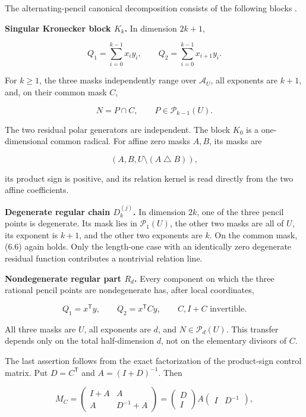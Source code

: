 \documentclass[11pt]{article}
\theoremstyle{remark}
\numberwithin{equation}{section}
\begin{document}
The alternating-pencil canonical decomposition consists of the following
blocks \cite{plut2015,macariorat2013}.

\textbf{Singular Kronecker block \(K_k\).} In dimension \(2k+1\),

\[
Q_1=\sum_{i=0}^{k-1}x_iy_i,
\qquad
Q_2=\sum_{i=0}^{k-1}x_{i+1}y_i.                \tag{6.5}
\]

For \(k\ge1\), the three masks independently range over \(\mathcal A_U\), all
exponents are \(k+1\), and, on their common mask \(C\),

\[
N=P\cap C,\qquad P\in\mathcal P_{k-1}(U).      \tag{6.6}
\]

The two residual polar generators are independent. The block \(K_0\) is a
one-dimensional common radical. For affine zero masks \(A,B\), its masks are

\[
(A,B,U\setminus(A\mathbin\triangle B)),
\]

its product sign is positive, and its relation kernel is read directly from
the two affine coefficients.

\textbf{Degenerate regular chain \(D_k^{(j)}\).} In dimension \(2k\), one of the
three pencil points is degenerate. Its mask lies in \(\mathcal P_1(U)\), the
other two masks are all of \(U\), its exponent is \(k+1\), and the other two
exponents are \(k\). On the common mask, (6.6) again holds. Only the length-one
case with an identically zero degenerate residual function contributes a
nontrivial relation line.

\textbf{Nondegenerate regular part \(R_d\).} Every component on which the three
rational pencil points are nondegenerate has, after local coordinates,

\[
Q_1=x^{\mathsf T}y,
\qquad Q_2=x^{\mathsf T}Cy,
\qquad C,I+C\text{ invertible}.                 \tag{6.7}
\]

All three masks are \(U\), all exponents are \(d\), and
\(N\in\mathcal P_d(U)\). This transfer depends only on the total half-dimension
\(d\), not on the elementary divisors of \(C\).

The last assertion follows from the exact factorization of the product-sign
control matrix. Put \(D=C^{\mathsf T}\) and \(A=(I+D)^{-1}\). Then

\[
M_C=
\begin{pmatrix}I+A&A\\A&D^{-1}+A\end{pmatrix}
=\begin{pmatrix}D\\I\end{pmatrix}
A
\begin{pmatrix}I&D^{-1}\end{pmatrix},           \tag{6.8}
\]
\end{document}
